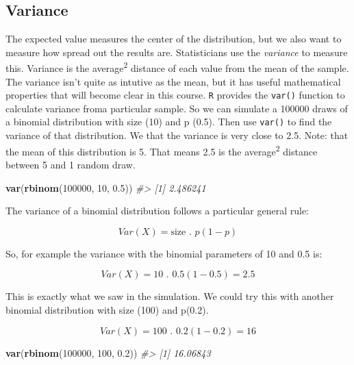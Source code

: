 \documentclass[]{article}
\newenvironment{Shaded}{\begin{snugshade}}{\end{snugshade}}
\newcommand{\CommentTok}[1]{\textcolor[rgb]{0.56,0.35,0.01}{\textit{#1}}}
\newcommand{\DecValTok}[1]{\textcolor[rgb]{0.00,0.00,0.81}{#1}}
\newcommand{\FloatTok}[1]{\textcolor[rgb]{0.00,0.00,0.81}{#1}}
\newcommand{\KeywordTok}[1]{\textcolor[rgb]{0.13,0.29,0.53}{\textbf{#1}}}
\newcommand{\NormalTok}[1]{#1}
\begin{document}
\hypertarget{variance}{%
\subsection{Variance}\label{variance}}

The expected value measures the center of the distribution, but we also
want to measure how spread out the results are. Statisticians use the
\emph{variance} to measure this. Variance is the
average\textsuperscript{2} distance of each value from the mean of the
sample. The variance isn't quite as intutive as the mean, but it has
useful mathematical properties that will become clear in this course.
\texttt{R} provides the \texttt{var()} function to calculate variance
froma particular sample. So we can simulate a 100000 draws of a binomial
distribution with size (10) and p (0.5). Then use \texttt{var()} to find
the variance of that distribution. We that the variance is very close to
2.5. Note: that the mean of this distribution is 5. That means 2.5 is
the average\textsuperscript{2} distance between 5 and 1 random draw.

\begin{Shaded}
\begin{Highlighting}[]
\KeywordTok{var}\NormalTok{(}\KeywordTok{rbinom}\NormalTok{(}\DecValTok{100000}\NormalTok{, }\DecValTok{10}\NormalTok{, }\FloatTok{0.5}\NormalTok{))}
\CommentTok{#> [1] 2.486241}
\end{Highlighting}
\end{Shaded}

The variance of a binomial distribution follows a particular general
rule:

\[Var(X) = \textrm{size . }  p(1 - p) \]

So, for example the variance with the binomial parameters of 10 and 0.5
is:

\[Var(X) = \textrm{10 . }  0.5(1 - 0.5) = 2.5\]

This is exactly what we saw in the simulation. We could try this with
another binomial distribution with size (100) and p(0.2).

\[Var(X) = \textrm{100 . }  0.2(1 - 0.2) = 16\]

\begin{Shaded}
\begin{Highlighting}[]
\KeywordTok{var}\NormalTok{(}\KeywordTok{rbinom}\NormalTok{(}\DecValTok{100000}\NormalTok{, }\DecValTok{100}\NormalTok{, }\FloatTok{0.2}\NormalTok{))}
\CommentTok{#> [1] 16.06843}
\end{Highlighting}
\end{Shaded}
\end{document}
